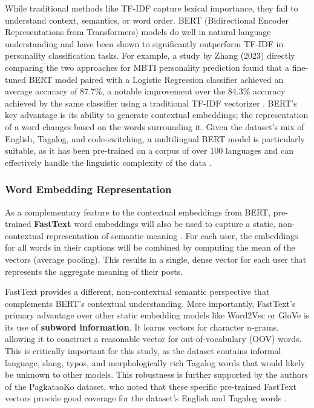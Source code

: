 While traditional methods like TF-IDF capture lexical importance, they fail to understand context, semantics, or word order. BERT (Bidirectional Encoder Representations from Transformers) models do well in natural language understanding and have been shown to significantly outperform TF-IDF in personality classification tasks. For example, a study by Zhang (2023) directly comparing the two approaches for MBTI personality prediction found that a fine-tuned BERT model paired with a Logistic Regression classifier achieved an average accuracy of 87.7\%, a notable improvement over the 84.3\% accuracy achieved by the same classifier using a traditional TF-IDF vectorizer \citep{zhang2023}. BERT's key advantage is its ability to generate contextual embeddings; the representation of a word changes based on the words surrounding it. Given the dataset's mix of English, Tagalog, and code-switching, a multilingual BERT model is particularly suitable, as it has been pre-trained on a corpus of over 100 languages and can effectively handle the linguistic complexity of the data \citep{devlin2018bert, cruz2022roberta}.

\subsubsection{Word Embedding Representation}
As a complementary feature to the contextual embeddings from BERT, pre-trained \textbf{FastText} word embeddings will also be used to capture a static, non-contextual representation of semantic meaning \citep{grave2018}. For each user, the embeddings for all words in their captions will be combined by computing the mean of the vectors (average pooling). This results in a single, dense vector for each user that represents the aggregate meaning of their posts.

FastText provides a different, non-contextual semantic perspective that complements BERT's contextual understanding. More importantly, FastText's primary advantage over other static embedding models like Word2Vec or GloVe is its use of \textbf{subword information}. It learns vectors for character n-grams, allowing it to construct a reasonable vector for out-of-vocabulary (OOV) words. This is critically important for this study, as the dataset contains informal language, slang, typos, and morphologically rich Tagalog words that would likely be unknown to other models. This robustness is further supported by the authors of the PagkataoKo dataset, who noted that these specific pre-trained FastText vectors provide good coverage for the dataset's English and Tagalog words \citep{tighe_acorda_2022}.

